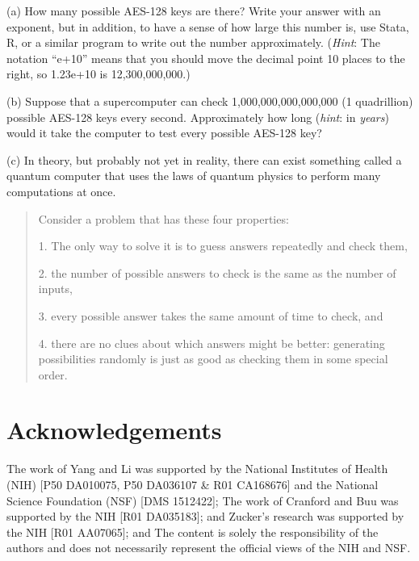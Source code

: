 \begin{enumerate*}
\setlength\itemsep{3pt}
\item[(a)] How many possible AES-128 keys are there? Write your answer with an exponent, but in addition, to have a sense of how large this number is, use Stata, R, or a similar program to write out the number approximately. (\textit{Hint}: The notation ``e+10'' means that you should move the decimal point 10 places to the right, so 1.23e+10 is 12,300,000,000.) 
\item[(b)] Suppose that a supercomputer can check 1,000,000,000,000,000 (1 quadril\-lion) possible AES-128 keys every second.  Approximately how long (\textit{hint}: in \textit{years}) would it take the computer to test every possible AES-128 key? 
\item[(c)] In theory, but probably not yet in reality, there can exist something called a quantum computer that uses the laws of quantum physics to perform many computations at once. 
\end{enumerate*}

\begin{quotation}
\noindent Consider a problem that has these four properties:
\begin{enumerate*}
\item[1.] The only way to solve it is to guess answers repeatedly and check them,
\item[2.] the number of possible answers to check is the same as the number of inputs,
\item[3.] every possible answer takes the same amount of time to check, and
\item[4.] there are no clues about which answers might be better: generating possibilities randomly is just as good as checking them in some special order.
\end{enumerate*}\vspace{3pt}

\end{quotation}

\section*{Acknowledgements}
The work of Yang and Li was supported by the National Institutes
of Health (NIH) [P50 DA010075, P50 DA036107 & R01 CA168676] and
the National Science Foundation (NSF) [DMS 1512422]; The work of
Cranford and Buu was supported by the NIH [R01 DA035183]; and
Zucker's research was supported by the NIH [R01 AA07065]; and The
content is solely the responsibility of the authors and does not
necessarily represent the official views of the NIH and NSF.
